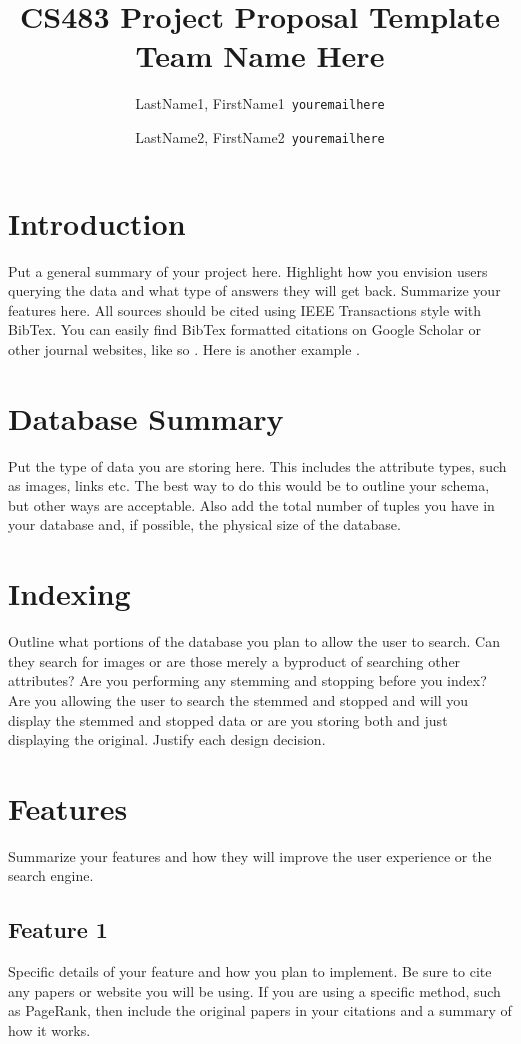 \documentclass[11pt]{article}
\title{CS483 Project Proposal Template\\
\large Team Name Here}
\author{
  LastName1, FirstName1\      \texttt{youremailhere}
  \and
  LastName2, FirstName2\      \texttt{youremailhere}
}
\date{}
\begin{document}
\maketitle

\section{Introduction}
Put a general summary of your project here. Highlight how you envision users querying the data and what type of answers they will get back. Summarize your features here. All sources should be cited using IEEE Transactions style with BibTex. You can easily find BibTex formatted citations on Google Scholar or other journal websites, like so \cite{amer2000optimizing}. Here is another example \cite{antoshenkov1995byte}.

\section{Database Summary}
Put the type of data you are storing here. This includes the attribute types, such as images, links etc. The best way to do this would be to outline your schema, but other ways are acceptable. Also add the total number of tuples you have in your database and, if possible, the physical size of the database.

\section{Indexing}
Outline what portions of the database you plan to allow the user to search. Can they search for images or are those merely a byproduct of searching other attributes? Are you performing any stemming and stopping before you index? Are you allowing the user to search the stemmed and stopped and will you display the stemmed and stopped data or are you storing both and just displaying the original. Justify each design decision.

\section{Features}
Summarize your features and how they will improve the user experience or the search engine.

\subsection{Feature 1}
Specific details of your feature and how you plan to implement. Be sure to cite any papers or website you will be using. If you are using a specific method, such as PageRank, then include the original papers in your citations and a summary of how it works.
\end{document}
